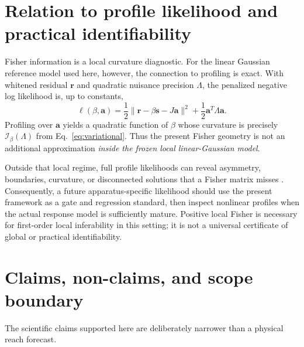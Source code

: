 \section{Relation to profile likelihood and practical identifiability}
\label{sec:profile}

Fisher information is a local curvature diagnostic. For the linear Gaussian reference model used here, however, the connection to profiling is exact. With whitened residual $\bm r$ and quadratic nuisance precision $\Lambda$, the penalized negative log likelihood is, up to constants,
\begin{equation}
 \ell(\beta,\bm a)
 =\frac12\|\bm r-\beta\bm s-J\bm a\|^2
 +\frac12\bm a^T\Lambda\bm a.
\end{equation}
Profiling over $\bm a$ yields a quadratic function of $\beta$ whose curvature is precisely $\mathcal I_\beta(\Lambda)$ from Eq.~\eqref{eq:variational}. Thus the present Fisher geometry is not an additional approximation \emph{inside the frozen local linear-Gaussian model}.

Outside that local regime, full profile likelihoods can reveal asymmetry, boundaries, curvature, or disconnected solutions that a Fisher matrix misses \cite{CoxReid1987,Wieland2021,Heinrich2025}. Consequently, a future apparatus-specific likelihood should use the present framework as a gate and regression standard, then inspect nonlinear profiles when the actual response model is sufficiently mature. Positive local Fisher is necessary for first-order local inferability in this setting; it is not a universal certificate of global or practical identifiability.

\section{Claims, non-claims, and scope boundary}
\label{sec:scope}

The scientific claims supported here are deliberately narrower than a physical reach forecast.

